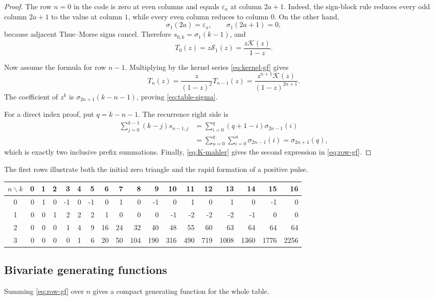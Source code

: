 \documentclass[11pt]{article}
\theoremstyle{definition}
\theoremstyle{remark}
\newcommand{\eps}{\varepsilon}
\newcommand{\K}{\mathcal K}
\newcommand{\Sgen}{\mathcal S}
\begin{document}
\begin{proof}
The row \(n=0\) in the code is zero at even columns and equals
\(\eps_a\) at column \(2a+1\).  Indeed, the sign-block rule reduces every
odd column \(2a+1\) to the value at column \(1\), while every even column
reduces to column \(0\).  On the other hand,
\[
 \sigma_1(2a)=\eps_a,
 \qquad
 \sigma_1(2a+1)=0,
\]
because adjacent Thue--Morse signs cancel.  Therefore
\(s_{0,k}=\sigma_1(k-1)\), and
\[
 T_0(z)=z\Sgen_1(z)=\frac{z\K(z)}{1-z}.
\]

Now assume the formula for row \(n-1\).  Multiplying by the kernel series
\cref{eq:kernel-gf} gives
\[
 T_n(z)=\frac{z}{(1-z)^2}T_{n-1}(z)
 =\frac{z^{n+1}\K(z)}{(1-z)^{2n+1}}.
\]
The coefficient of \(z^k\) is
\(\sigma_{2n+1}(k-n-1)\), proving \cref{eq:table-sigma}.

For a direct index proof, put \(q=k-n-1\).  The recurrence right side is
\begin{align*}
 \sum_{j=0}^{k-1}(k-j)s_{n-1,j}
 &=\sum_{i=0}^{q}(q+1-i)\sigma_{2n-1}(i)\\
 &=\sum_{u=0}^{q}\sum_{i=0}^{u}\sigma_{2n-1}(i)
 =\sigma_{2n+1}(q),
\end{align*}
which is exactly two inclusive prefix summations.
Finally, \cref{eq:K-mahler} gives the second expression in
\cref{eq:row-gf}.
\end{proof}

The first rows illustrate both the initial zero triangle and the rapid
formation of a positive pulse.
\begin{center}
\small
\setlength{\tabcolsep}{3.6pt}
\begin{tabular}{c|rrrrrrrrrrrrrrrrr}
\toprule
\(n\backslash k\)&0&1&2&3&4&5&6&7&8&9&10&11&12&13&14&15&16\\
\midrule
0&0&1&0&-1&0&-1&0&1&0&-1&0&1&0&1&0&-1&0\\
1&0&0&1&2&2&2&1&0&0&0&-1&-2&-2&-2&-1&0&0\\
2&0&0&0&1&4&9&16&24&32&40&48&55&60&63&64&64&64\\
3&0&0&0&0&1&6&20&50&104&190&316&490&719&1008&1360&1776&2256\\
\bottomrule
\end{tabular}
\end{center}

\subsection{Bivariate generating functions}

Summing \cref{eq:row-gf} over \(n\) gives a compact generating function for
the whole table.
\end{document}
